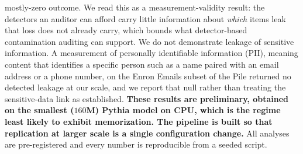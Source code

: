 mostly-zero outcome. We read this as a measurement-validity result: the detectors an
auditor can afford carry little information about \emph{which} items leak that loss does
not already carry, which bounds what detector-based contamination auditing can support.
We do not demonstrate leakage of sensitive information. A measurement of personally
identifiable information (PII), meaning content that identifies a specific person such as a
name paired with an email address or a phone number, on the Enron Emails subset of the Pile
returned no detected leakage at our scale, and we report that null rather than treating the
sensitive-data link as established. \textbf{These results
are preliminary, obtained on the smallest ($160$M) Pythia model on CPU, which is the
regime least likely to exhibit memorization. The pipeline is built so that replication at
larger scale is a single configuration change.} All analyses are pre-registered and every
number is reproducible from a seeded script.
